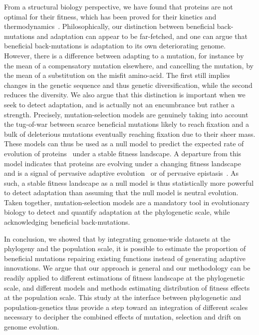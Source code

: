 \documentclass{article}
\begin{document}
    From a structural biology perspective, we have found that proteins are not optimal for their fitness, which has been proved for their kinetics and thermodynamics~\cite{hartl_compensatory_1996, taverna_why_2002, goldstein_evolution_2011}.
    Philosophically, our distinction between beneficial back-mutations and adaptation can appear to be far-fetched, and one can argue that beneficial back-mutations is adaptation to its own deteriorating genome.
    However, there is a difference between adapting to a mutation, for instance by the mean of a compensatory mutation elsewhere, and cancelling the mutation, by the mean of a substitution on the misfit amino-acid.
    The first still implies changes in the genetic sequence and thus genetic diversification, while the second reduces the diversity.
    We also argue that this distinction is important when we seek to detect adaptation, and is actually not an encumbrance but rather a strength.
    Precisely, mutation-selection models are genuinely taking into account the tug-of-war between scarce beneficial mutations likely to reach fixation and a bulk of deleterious mutations eventually reaching fixation due to their sheer mass.
    These models can thus be used as a null model to predict the expected rate of evolution of proteins~\cite{spielman_relationship_2015, dosreis_how_2015} under a stable fitness landscape.
    A departure from this model indicates that proteins are evolving under a changing fitness landscape~\cite{cvijovic_fate_2015, rodrigue_detecting_2017, tamuri_mutationselection_2021} and is a signal of pervasive adaptive evolution~\cite{rodrigue_bayesian_2021} or of pervasive epistasis~\cite{rodrigue_detecting_2017}.
    As such, a stable fitness landscape as a null model is thus statistically more powerful to detect adaptation than assuming that the null model is neutral evolution.
    Taken together, mutation-selection models are a mandatory tool in evolutionary biology to detect and quantify adaptation at the phylogenetic scale, while acknowledging beneficial back-mutations.

    In conclusion, we showed that by integrating genome-wide datasets at the phylogeny and the population scale, it is possible to estimate the proportion of beneficial mutations repairing existing functions instead of generating adaptive innovations.
    We argue that our approach is general and our methodology can be readily applied to different estimations of fitness landscape at the phylogenetic scale, and different models and methods estimating distribution of fitness effects at the population scale.
    This study at the interface between phylogenetic and population-genetics thus provide a step toward an integration of different scales necessary to decipher the combined effects of mutation, selection and drift on genome evolution.
\end{document}
